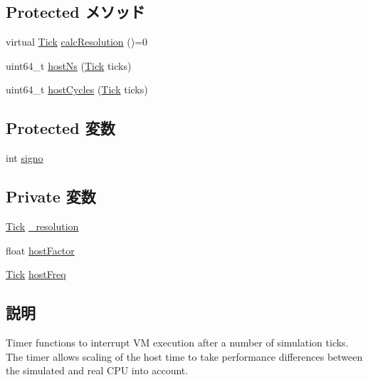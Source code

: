 \subsection*{Protected メソッド}
\begin{DoxyCompactItemize}
\item 
virtual \hyperlink{base_2types_8hh_a5c8ed81b7d238c9083e1037ba6d61643}{Tick} \hyperlink{classBaseKvmTimer_a8bff362cf60f8a6adbdc0aa31cb9be27}{calcResolution} ()=0
\item 
uint64\_\-t \hyperlink{classBaseKvmTimer_a1e40d82dba12b48d6298661480977ff9}{hostNs} (\hyperlink{base_2types_8hh_a5c8ed81b7d238c9083e1037ba6d61643}{Tick} ticks)
\item 
uint64\_\-t \hyperlink{classBaseKvmTimer_ab987095ba5c55b83638d48c3b69693d4}{hostCycles} (\hyperlink{base_2types_8hh_a5c8ed81b7d238c9083e1037ba6d61643}{Tick} ticks)
\end{DoxyCompactItemize}
\subsection*{Protected 変数}
\begin{DoxyCompactItemize}
\item 
int \hyperlink{classBaseKvmTimer_a68acd751895efa9ac5a6461017f1d2d8}{signo}
\end{DoxyCompactItemize}
\subsection*{Private 変数}
\begin{DoxyCompactItemize}
\item 
\hyperlink{base_2types_8hh_a5c8ed81b7d238c9083e1037ba6d61643}{Tick} \hyperlink{classBaseKvmTimer_ad8d1a189e5fdd7cf11ab8165cf05a88c}{\_\-resolution}
\item 
float \hyperlink{classBaseKvmTimer_a0ef366aa4bbbcdc2f7eeb7fcd3962dde}{hostFactor}
\item 
\hyperlink{base_2types_8hh_a5c8ed81b7d238c9083e1037ba6d61643}{Tick} \hyperlink{classBaseKvmTimer_af880b55be2bf83ac65eb9b0abe62ae49}{hostFreq}
\end{DoxyCompactItemize}


\subsection{説明}
Timer functions to interrupt VM execution after a number of simulation ticks. The timer allows scaling of the host time to take performance differences between the simulated and real CPU into account.

